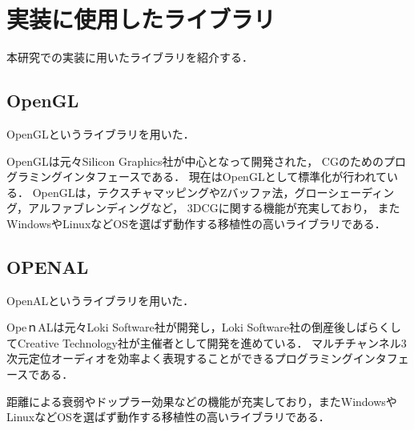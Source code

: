 \chapter{実装に使用したライブラリ}

本研究での実装に用いたライブラリを紹介する．

\section{OpenGL}
OpenGL\cite{OPENGL}というライブラリを用いた．

OpenGLは元々Silicon Graphics社が中心となって開発された，
CGのためのプログラミングインタフェースである．
現在はOpenGLとして標準化が行われている．
OpenGLは，テクスチャマッピングやZバッファ法，グローシェーディング，アルファブレンディングなど，
3DCGに関する機能が充実しており，
またWindowsやLinuxなどOSを選ばず動作する移植性の高いライブラリである．

\section{OPENAL}
OpenAL\cite{OPENAL}というライブラリを用いた．

OpeｎALは元々Loki Software社が開発し，Loki Software社の倒産後しばらくしてCreative Technology社が主催者として開発を進めている．
マルチチャンネル3次元定位オーディオを効率よく表現することができるプログラミングインタフェースである．

距離による衰弱やドップラー効果などの機能が充実しており，またWindowsやLinuxなどOSを選ばず動作する移植性の高いライブラリである．


